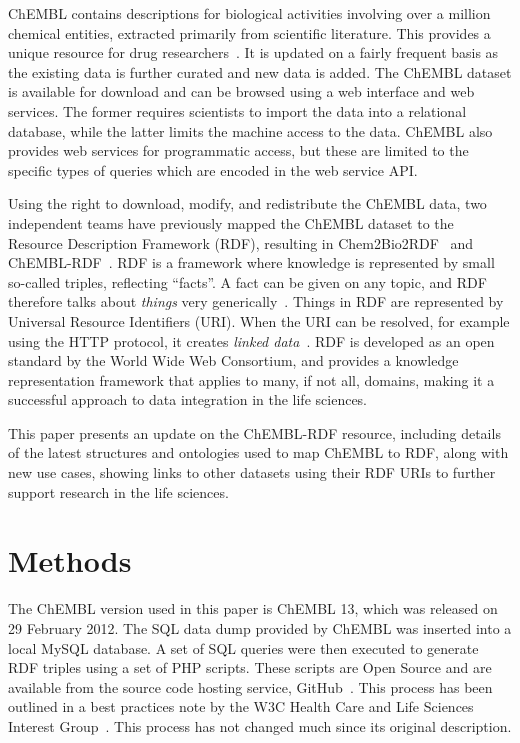 \documentclass[10pt]{bmc_article}
\newenvironment{bmcformat}{\begin{raggedright}\baselineskip20pt\sloppy\setboolean{publ}{false}}{\end{raggedright}\baselineskip20pt\sloppy}
\begin{document}
\begin{bmcformat}
ChEMBL contains descriptions for biological activities involving over a million chemical 
entities, extracted primarily from scientific literature. This provides a unique resource for drug researchers~\cite{Gaulton2012,Warr2009}.
It is updated on a fairly frequent basis as the existing data is further curated and new data is added. 
The ChEMBL dataset is available for download and can be browsed using a web interface and web services.
The former requires scientists to import the data into a relational database, while the 
latter limits the machine access to the data. ChEMBL also provides web services for programmatic
access, but these are limited to the specific types of queries which are encoded in the web service API. 

Using the right to download, modify, and redistribute the ChEMBL data, two independent teams
have previously mapped the ChEMBL dataset to the Resource Description Framework (RDF), resulting
in Chem2Bio2RDF~\cite{Chen2010} and ChEMBL-RDF~\cite{Willighagen2011}. RDF is a framework where
knowledge is represented by small so-called triples, reflecting ``facts''. A fact can
be given on any topic, and RDF therefore talks about \textit{things} very generically~\cite{Miller:04:RP}. Things in RDF
are represented by Universal Resource Identifiers (URI). When the URI can be resolved, 
for example using the HTTP protocol, it creates \emph{linked data}~\cite{Samwald2011}. RDF is
developed as an open standard by the World Wide Web Consortium, and provides a knowledge
representation framework that applies to many, if not all, domains, making it a successful 
approach to data integration in the life sciences.

This paper presents an update on the ChEMBL-RDF resource, including details of the latest structures
and ontologies used to map ChEMBL to RDF, along with new use cases, showing 
links to other datasets using their RDF URIs to further support research in the life sciences.

\section*{Methods}
\label{s2}

The ChEMBL version used in this paper is ChEMBL 13, which was released on 29 February 2012.
The SQL data dump provided by ChEMBL was inserted into a local MySQL database. A set of SQL queries 
were then executed to generate RDF triples using a set of PHP scripts. These scripts are Open Source 
and are available from the source code hosting service, GitHub~\cite{ChEMBLRDFGitHub}. This process 
has been outlined in a best practices note by the W3C Health Care and Life Sciences Interest
Group~\cite{Marshall2012}. This process has not changed much since its original description.


\end{bmcformat}
\end{document}
